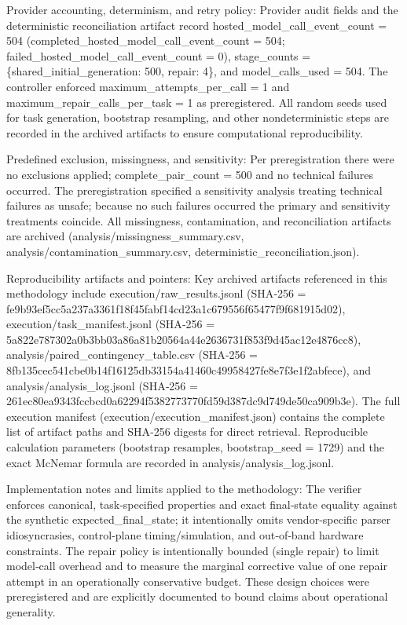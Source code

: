 \documentclass[conference]{IEEEtran}
\begin{document}
Provider accounting, determinism, and retry policy: Provider audit fields and the deterministic reconciliation artifact record hosted\_model\_call\_event\_count = 504 (completed\_hosted\_model\_call\_event\_count = 504; failed\_hosted\_model\_call\_event\_count = 0), stage\_counts = \{shared\_initial\_generation: 500, repair: 4\}, and model\_calls\_used = 504. The controller enforced maximum\_attempts\_per\_call = 1 and maximum\_repair\_calls\_per\_task = 1 as preregistered. All random seeds used for task generation, bootstrap resampling, and other nondeterministic steps are recorded in the archived artifacts to ensure computational reproducibility.

Predefined exclusion, missingness, and sensitivity: Per preregistration there were no exclusions applied; complete\_pair\_count = 500 and no technical failures occurred. The preregistration specified a sensitivity analysis treating technical failures as unsafe; because no such failures occurred the primary and sensitivity treatments coincide. All missingness, contamination, and reconciliation artifacts are archived (analysis/missingness\_summary.csv, analysis/contamination\_summary.csv, deterministic\_reconciliation.json).

Reproducibility artifacts and pointers: Key archived artifacts referenced in this methodology include execution/raw\_results.jsonl (SHA‑256 = fe9b93ef\allowbreak{}5cc5a237\allowbreak{}a3361f18\allowbreak{}f45fabf1\allowbreak{}4cd23a1c\allowbreak{}679556f6\allowbreak{}5477f9f6\allowbreak{}81915d02), execution/task\_manifest.jsonl (SHA‑256 = 5a822e78\allowbreak{}7302a0b3\allowbreak{}bb03a86a\allowbreak{}81b20564\allowbreak{}a44e2636\allowbreak{}731f853f\allowbreak{}9d45ac12\allowbreak{}e4876cc8), analysis/paired\_contingency\_table.csv (SHA‑256 = 8fb135ce\allowbreak{}c541cbe0\allowbreak{}b14f1612\allowbreak{}5db33154\allowbreak{}a41460c4\allowbreak{}9958427f\allowbreak{}e8e7f3e1\allowbreak{}f2abfece), and analysis/analysis\_log.jsonl (SHA‑256 = 261ec80e\allowbreak{}a9343fcc\allowbreak{}bcd0a622\allowbreak{}94f53827\allowbreak{}73770fd5\allowbreak{}9d387dc9\allowbreak{}d749de50\allowbreak{}ca909b3e). The full execution manifest (execution/execution\_manifest.json) contains the complete list of artifact paths and SHA‑256 digests for direct retrieval. Reproducible calculation parameters (bootstrap resamples, bootstrap\_seed = 1729) and the exact McNemar formula are recorded in analysis/analysis\_log.jsonl.

Implementation notes and limits applied to the methodology: The verifier enforces canonical, task‑specified properties and exact final‑state equality against the synthetic expected\_final\_state; it intentionally omits vendor‑specific parser idiosyncrasies, control‑plane timing/simulation, and out‑of‑band hardware constraints. The repair policy is intentionally bounded (single repair) to limit model‑call overhead and to measure the marginal corrective value of one repair attempt in an operationally conservative budget. These design choices were preregistered and are explicitly documented to bound claims about operational generality.
\end{document}
